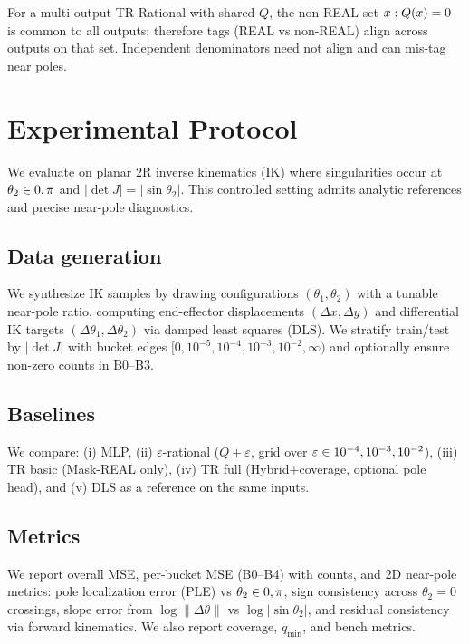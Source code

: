 \documentclass[11pt,twoside]{article}
\begin{document}
\begin{lemma}\label{lem:sharedq}
For a multi-output TR-Rational with shared $Q$, the non-REAL set $\\{x: Q(x)=0\\}$ is common to all outputs; therefore tags (REAL vs non-REAL) align across outputs on that set. Independent denominators need not align and can mis-tag near poles.
\end{lemma}
\section{Experimental Protocol}
\label{sec:protocol}

We evaluate on planar 2R inverse kinematics (IK) where singularities occur at $\theta_2\in\\{0,\pi\\}$ and $|\det J|=|\sin\theta_2|$. This controlled setting admits analytic references and precise near-pole diagnostics.

\subsection{Data generation}

We synthesize IK samples by drawing configurations $(\theta_1,\theta_2)$ with a tunable near-pole ratio, computing end-effector displacements $(\Delta x, \Delta y)$ and differential IK targets $(\Delta\theta_1,\Delta\theta_2)$ via damped least squares (DLS). We stratify train/test by $|\det J|$ with bucket edges $[0,10^{-5},10^{-4},10^{-3},10^{-2},\infty)$ and optionally ensure non-zero counts in B0--B3.

\subsection{Baselines}

We compare: (i) MLP, (ii) $\varepsilon$-rational ($Q+\varepsilon$, grid over $\varepsilon\in\\{10^{-4},10^{-3},10^{-2}\\}$), (iii) TR basic (Mask-REAL only), (iv) TR full (Hybrid+coverage, optional pole head), and (v) DLS as a reference on the same inputs.

\subsection{Metrics}

We report overall MSE, per-bucket MSE (B0--B4) with counts, and 2D near-pole metrics: pole localization error (PLE) vs $\theta_2\in\\{0,\pi\\}$, sign consistency across $\theta_2=0$ crossings, slope error from $\log\|\Delta\theta\|$ vs $\log|\sin\theta_2|$, and residual consistency via forward kinematics. We also report coverage, $q_{\min}$, and bench metrics.
\end{document}
